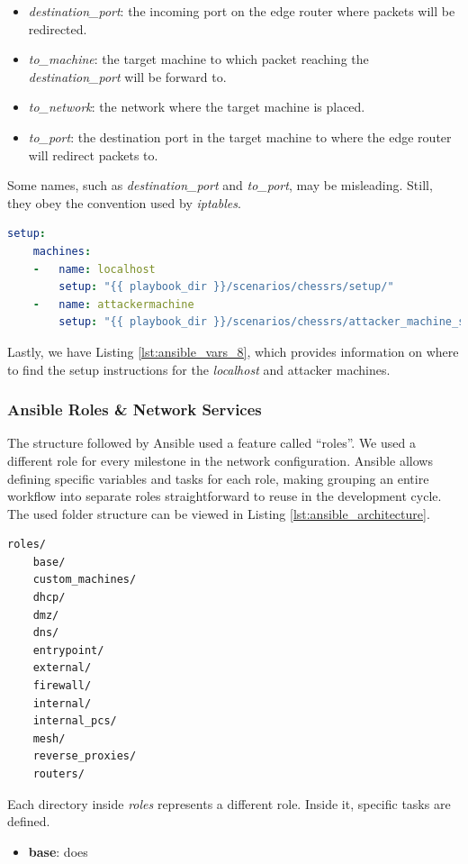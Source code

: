 \begin{itemize}
    \item \textit{destination\_port}: the incoming port on the edge router where packets will be redirected.
    \item \textit{to\_machine}: the target machine to which packet reaching the \textit{destination\_port} will be forward to.
    \item \textit{to\_network}: the network where the target machine is placed.
    \item \textit{to\_port}: the destination port in the target machine to where the edge router will redirect packets to.
\end{itemize}

Some names, such as \textit{destination\_port} and \textit{to\_port}, may be misleading. Still, they obey the convention used by \textit{iptables}.

\begin{lstlisting}[language=yaml,caption=Ansible Variables - Setup Section.,numbers=none,label={lst:ansible_vars_8}]
setup:
    machines:
    -   name: localhost
        setup: "{{ playbook_dir }}/scenarios/chessrs/setup/"
    -   name: attackermachine
        setup: "{{ playbook_dir }}/scenarios/chessrs/attacker_machine_setup/*.j2"
\end{lstlisting}

Lastly, we have Listing \ref{lst:ansible_vars_8}, which provides information on where to find the setup instructions for the \textit{localhost} and attacker machines.

\subsubsection{Ansible Roles \& Network Services} \label{sec:ansible_roles}

The structure followed by Ansible used a feature called ``roles''. We used a different role for every milestone in the network configuration. Ansible allows defining specific variables and tasks for each role, making grouping an entire workflow into separate roles straightforward to reuse in the development cycle. The used folder structure can be viewed in Listing \ref{lst:ansible_architecture}.

\begin{lstlisting}[caption=Ansible Roles' Folder Structure.,numbers=none,label={lst:ansible_architecture}]
roles/
    base/             
    custom_machines/
    dhcp/
    dmz/
    dns/
    entrypoint/
    external/
    firewall/
    internal/
    internal_pcs/
    mesh/
    reverse_proxies/
    routers/
\end{lstlisting}

Each directory inside \textit{roles} represents a different role. Inside it, specific tasks are defined.  

\begin{itemize}
    \item \textbf{base}: does 
\end{itemize}